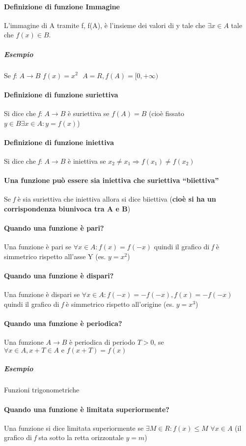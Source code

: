 \paragraph{Definizione di funzione Immagine}
L'immagine di A tramite f, f(A), è l'insieme dei valori di y tale che $\exists
x \in A$ tale che $f(x) \in B$.
\subparagraph{Esempio} Se \textit{f}: $A\to B$ $f(x)=x^2 \text{ } A=R,
f(A)=[0,+\infty)$\\
\paragraph{Definizione di funzione suriettiva} Si dice che \textit{f}: $A\to B$
è suriettiva se $f(A)=B$ (cioè fissato $y\in B \exists x\in A: y=f(x)$)
\paragraph{Definizione di funzione iniettiva}
Si dice che \textit{f}: $A\to B$ è iniettiva se $x_2\neq x_1\Rightarrow f(x_1)
\neq f(x_2)$
\paragraph{Una funzione può essere sia iniettiva che suriettiva ``biiettiva''}
Se \textit{f} è sia suriettiva che iniettiva allora si dice biiettiva (\textbf{cioè si
ha un corrispondenza biunivoca tra A e B})
\paragraph{Quando una funzione è pari?}
Una funzione è pari se $\forall x\in A: f(x)=f(-x)$ quindi il grafico di
\textit{f} è simmetrico rispetto all'asse Y (es. $y=x^2$)
\paragraph{Quando una funzione è dispari?}
Una funzione è dispari se $\forall x\in A: f(-x)=-f(-x), f(x)=-f(-x)$ quindi il
grafico di \textit{f} è simmetrico rispetto all'origine (es. $y=x^3$)
\paragraph{Quando una funzione è periodica?}
Una funzione $A\to B$ è periodica di periodo $T>0$, se $\forall x \in A, x+T\in
A \text{ e } f(x+T)=f(x)$ 
\subparagraph{Esempio} Funzioni trigonometriche
\paragraph{Quando una funzione è limitata superiormente?}
Una funzione si dice limitata superiormente se $\exists M\in R: f(x)\leq M$
$\forall x \in A$ (il grafico di \textit{f} sta sotto la retta orizzontale $y=m$)
